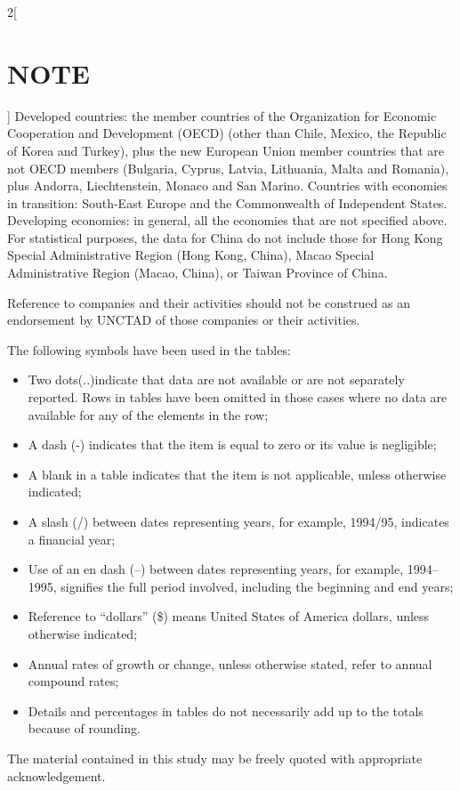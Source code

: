 \documentclass[a4paper, UTF8, 12pt]{article}
\begin{document}
\begin{paracol}{2}[\section{NOTE}]
    Developed countries: the member countries of the Organization for Economic Cooperation and Development (OECD) (other than Chile, Mexico, the Republic of Korea and Turkey), plus the new European Union member countries that are not OECD members (Bulgaria, Cyprus, Latvia, Lithuania, Malta and Romania), plus Andorra, Liechtenstein, Monaco and San Marino. Countries with economies in transition: South-East Europe and the Commonwealth of Independent States. Developing economies: in general, all the economies that are not specified above. For statistical purposes, the data for China do not include those for Hong Kong Special Administrative Region (Hong Kong, China), Macao Special Administrative Region (Macao, China), or Taiwan Province of China. 

    Reference to companies and their activities should not be construed as an endorsement by UNCTAD of those companies or their activities.

    The following symbols have been used in the tables: 
    \begin{itemize}
        \item Two dots(..)indicate that data are not available or are not separately reported. Rows in tables have been omitted in those cases where no data are available for any of the elements in the row; 
        \item A dash (-) indicates that the item is equal to zero or its value is negligible;
        \item A blank in a table indicates that the item is not applicable, unless otherwise indicated; 
        \item A slash (/) between dates representing years, for example, 1994/95, indicates a financial year; 
        \item Use of an en dash (–) between dates representing years, for example, 1994–1995, signifies the full period involved, including the beginning and end years; 
        \item Reference to “dollars” (\$) means United States of America dollars, unless otherwise indicated; 
        \item Annual rates of growth or change, unless otherwise stated, refer to annual compound rates; 
        \item Details and percentages in tables do not necessarily add up to the totals because of rounding. 
    \end{itemize}

    The material contained in this study may be freely quoted with appropriate acknowledgement.


\end{paracol}
\end{document}
